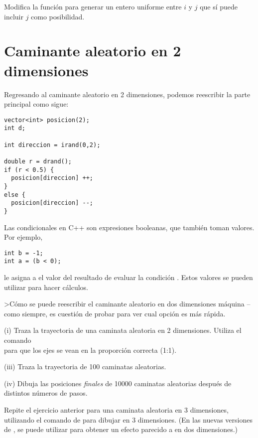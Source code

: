 \ejercicio Modifica la función  para generar un entero uniforme
entre $i$ y $j$ que sí puede incluir $j$ como posibilidad.


\section{Caminante aleatorio en 2 dimensiones}
Regresando al caminante aleatorio en 2 dimensiones,
podemos reescribir la parte principal como sigue:
\begin{lstlisting}
vector<int> posicion(2);
int d;

int direccion = irand(0,2); 	

double r = drand();
if (r < 0.5) {
  posicion[direccion] ++;
}
else {
  posicion[direccion] --;
}
\end{lstlisting}

{\dbend \small
Las condicionales en C++ son expresiones booleanas, que también toman valores.
Por ejemplo, 
\begin{lstlisting}
int b = -1;
int a = (b < 0);
\end{lstlisting}
le asigna a  el valor del resultado de evaluar la condición .
Estos valores
se pueden utilizar para hacer cálculos.

\ejercicio >Cómo se puede reescribir el caminante aleatorio en dos dimensiones
máquina --como siempre, es cuestión de probar para ver cual opción es más
rápida.
}




(i) Traza la trayectoria de una caminata aleatoria en 2 dimensiones.
Utiliza el comando \\
 para que los ejes se vean en la
proporción correcta (1:1).

(iii) Traza la trayectoria de 100 caminatas aleatorias.

(iv) Dibuja las posiciones \emph{finales} de 10000 caminatas aleatorias después
de distintos números de pasos.

\ejercicio
Repite el ejercicio anterior para una caminata aleatoria en 3 dimensiones,
utilizando el comando  de  para dibujar en 3
dimensiones. (En las nuevas versiones de , se puede utilizar
 para obtener un efecto parecido a 
 en dos dimensiones.)


